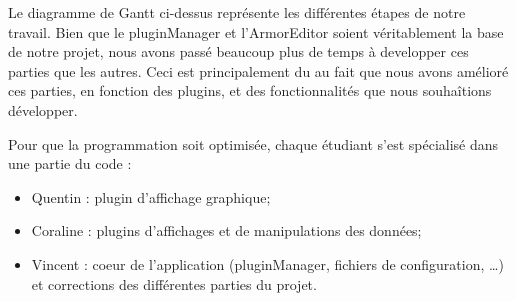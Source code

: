 \documentclass[a4paper]{article}
\begin{document}
Le diagramme de Gantt ci-dessus représente les différentes étapes de notre travail. Bien que le pluginManager et l'ArmorEditor soient véritablement la base de notre projet, nous avons passé beaucoup plus de temps à developper ces parties que les autres. Ceci est principalement du au fait que nous avons amélioré ces parties, en fonction des plugins, et des fonctionnalités que nous souhaîtions développer.

Pour que la programmation soit optimisée, chaque étudiant s'est spécialisé dans une partie du code :
\begin{itemize}
	\item Quentin : plugin d'affichage graphique;
	\item Coraline : plugins d'affichages et de manipulations des données;  
	\item Vincent : coeur de l'application (pluginManager, fichiers de configuration, \dots) et corrections des différentes parties du projet.

\end{itemize}
\end{document}
